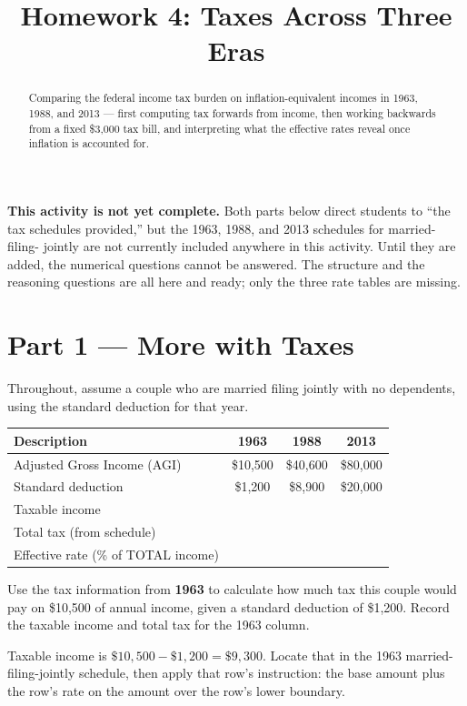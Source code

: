 \documentclass[12pt]{ximera}
\title{Homework 4: Taxes Across Three Eras}
\begin{document}
\begin{abstract}
Comparing the federal income tax burden on inflation-equivalent incomes in 1963, 1988,
and 2013 --- first computing tax forwards from income, then working backwards from a
fixed \$3,000 tax bill, and interpreting what the effective rates reveal once inflation
is accounted for.
\end{abstract}
\maketitle

\begin{instructorNotes}
\textbf{This activity is not yet complete.} Both parts below direct students to ``the
tax schedules provided,'' but the 1963, 1988, and 2013 schedules for married-filing-
jointly are not currently included anywhere in this activity. Until they are added, the
numerical questions cannot be answered. The structure and the reasoning questions are
all here and ready; only the three rate tables are missing.
\end{instructorNotes}

\section*{Part 1 --- More with Taxes}

Throughout, assume a couple who are married filing jointly with no dependents, using
the standard deduction for that year.

\begin{center}
\begin{tabular}{|l|c|c|c|}
\hline
\textbf{Description} & \textbf{1963} & \textbf{1988} & \textbf{2013} \\
\hline
Adjusted Gross Income (AGI) & \$10,500 & \$40,600 & \$80,000 \\
\hline
Standard deduction & \$1,200 & \$8,900 & \$20,000 \\
\hline
Taxable income & & & \\
\hline
Total tax (from schedule) & & & \\
\hline
Effective rate (\% of TOTAL income) & & & \\
\hline
\end{tabular}
\end{center}

\begin{problem}
Use the tax information from \textbf{1963} to calculate how much tax this couple would
pay on \$10,500 of annual income, given a standard deduction of \$1,200. Record the
taxable income and total tax for the 1963 column.

\showwork

\begin{freeResponse}
\end{freeResponse}

\begin{solution}
Taxable income is $\$10{,}500 - \$1{,}200 = \$9{,}300$. Locate that in the 1963
married-filing-jointly schedule, then apply that row's instruction: the base amount plus
the row's rate on the amount over the row's lower boundary.
\end{solution}
\end{problem}
\end{document}
